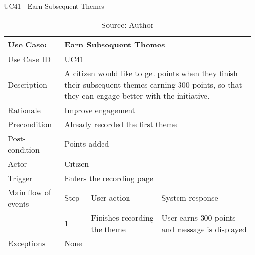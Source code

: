 \begin{table}[ht]
\centering
\caption{UC41 - Earn Subsequent Themes}
\label{uc:41}
\begin{tabular}{|p{3cm}|p{1cm}|p{5cm}|p{5cm}|}
\hline
Use Case:       & \multicolumn{3}{p{11cm}|}{Earn Subsequent Themes} \\ \hline
Use Case ID     & \multicolumn{3}{p{11cm}|}{UC41} \\ \hline
Description     & \multicolumn{3}{p{11cm}|}{A citizen would like to get points when they finish their subsequent themes earning 300 points, so that they can engage better with the initiative.} \\ \hline
Rationale       & \multicolumn{3}{p{11cm}|}{Improve engagement} \\ \hline
Precondition    & \multicolumn{3}{p{11cm}|}{Already recorded the first theme} \\ \hline
Post-condition  & \multicolumn{3}{p{11cm}|}{Points added} \\ \hline
Actor           & \multicolumn{3}{p{11cm}|}{Citizen} \\ \hline
Trigger         & \multicolumn{3}{p{11cm}|}{Enters the recording page} \\ \hline
Main flow of events & Step  & User action & System response \\ \hline
                    & 1     & Finishes recording the theme & User earns 300 points and message is displayed \\ \hline
Exceptions      & \multicolumn{3}{p{11cm}|}{None} \\ \hline
\end{tabular}
\caption*{Source: Author}
\end{table}

